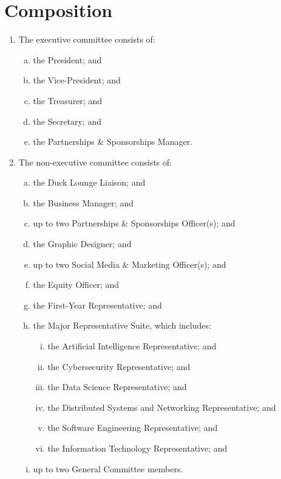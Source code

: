 \documentclass{schedule}
\begin{document}
\section{Composition}\label{composition}
\begin{enumerate}[(1)]
    \item The executive committee consists of:
          \begin{enumerate}[(a)]
              \item the President; and
              \item the Vice-President; and
              \item the Treasurer; and
              \item the Secretary; and
              \item the Partnerships \& Sponsorships Manager.
          \end{enumerate}
    \item The non-executive committee consists of:
          \begin{enumerate}[(a)]
              \item the Duck Lounge Liaison; and
              \item the Business Manager; and
              \item up to two Partnerships \& Sponsorships Officer(s); and
              \item the Graphic Designer; and
              \item up to two Social Media \& Marketing Officer(s); and
              \item the Equity Officer; and
              \item the First-Year Representative; and
              \item the Major Representative Suite, which includes:
                    \begin{enumerate}[(i)]
                        \item the Artificial Intelligence Representative; and
                        \item the Cybersecurity Representative; and
                        \item the Data Science Representative; and
                        \item the Distributed Systems and Networking Representative; and
                        \item the Software Engineering Representative; and
                        \item the Information Technology Representative; and
                    \end{enumerate}
              \item up to two General Committee members.
          \end{enumerate}
\end{enumerate}
\end{document}
